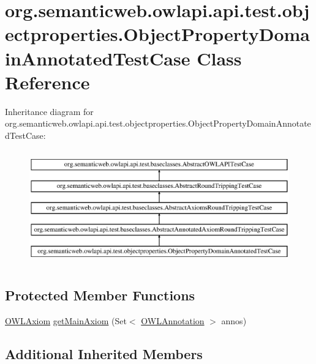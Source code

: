\hypertarget{classorg_1_1semanticweb_1_1owlapi_1_1api_1_1test_1_1objectproperties_1_1_object_property_domain_annotated_test_case}{\section{org.\-semanticweb.\-owlapi.\-api.\-test.\-objectproperties.\-Object\-Property\-Domain\-Annotated\-Test\-Case Class Reference}
\label{classorg_1_1semanticweb_1_1owlapi_1_1api_1_1test_1_1objectproperties_1_1_object_property_domain_annotated_test_case}
}
Inheritance diagram for org.\-semanticweb.\-owlapi.\-api.\-test.\-objectproperties.\-Object\-Property\-Domain\-Annotated\-Test\-Case\-:\begin{figure}[H]
\begin{center}
\leavevmode
\includegraphics[height=5.000000cm]{classorg_1_1semanticweb_1_1owlapi_1_1api_1_1test_1_1objectproperties_1_1_object_property_domain_annotated_test_case}
\end{center}
\end{figure}
\subsection*{Protected Member Functions}
\begin{DoxyCompactItemize}
\item 
\hyperlink{interfaceorg_1_1semanticweb_1_1owlapi_1_1model_1_1_o_w_l_axiom}{O\-W\-L\-Axiom} \hyperlink{classorg_1_1semanticweb_1_1owlapi_1_1api_1_1test_1_1objectproperties_1_1_object_property_domain_annotated_test_case_a286578458f3934a9d6c8da8e6f2535cd}{get\-Main\-Axiom} (Set$<$ \hyperlink{interfaceorg_1_1semanticweb_1_1owlapi_1_1model_1_1_o_w_l_annotation}{O\-W\-L\-Annotation} $>$ annos)
\end{DoxyCompactItemize}
\subsection*{Additional Inherited Members}



